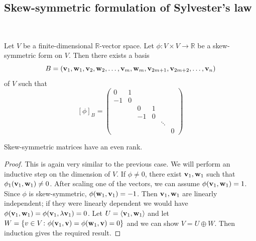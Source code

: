 \documentclass[a4paper,11pt]{article}
\begin{document}
\subsection{Skew-symmetric formulation of Sylvester's law}
\ \vspace*{-1.5em}
\begin{theorem}
	Let \( V \) be a finite-dimensional \( \mathbb R \)-vector space.
	Let \( \phi \colon V \times V \to \mathbb R \) be a skew-symmetric form on \( V \).
	Then there exists a basis
	\[
		B = ({\bf v}_1, {\bf w}_1, {\bf v}_2, {\bf w}_2, \dots, {\bf v}_m, {\bf w}_m, {\bf v}_{2m+1}, {\bf v}_{2m+2}, \dots, {\bf v}_n)
	\]
	of \( V \) such that
	\[
		[\phi]_B = \begin{pmatrix}
			0  & 1                       \\
			-1 & 0                       \\
			   &   & 0  & 1              \\
			   &   & -1 & 0              \\
			   &   &    &   & \ddots     \\
			   &   &    &   &        & 0
		\end{pmatrix}
	\]
\end{theorem}
\begin{corollary}
	Skew-symmetric matrices have an even rank.
\end{corollary}
\begin{proof}
	This is again very similar to the previous case.
	We will perform an inductive step on the dimension of \( V \).
	If \( \phi \neq 0 \), there exist \( {\bf v}_1, {\bf w}_1 \) such that \( \phi_1({\bf v}_1, {\bf w}_1) \neq 0 \).
	After scaling one of the vectors, we can assume \( \phi({\bf v}_1, {\bf w}_1) = 1 \).
	Since \( \phi \) is skew-symmetric, \( \phi({\bf w}_1, {\bf v}_1) = -1 \).
	Then \( {\bf v}_1, {\bf w}_1 \) are linearly independent; if they were linearly dependent we would have \( \phi({\bf v}_1, {\bf w}_1) = \phi({\bf v}_1, \lambda {\bf v}_1) = 0 \).
	Let \( U = \left\langle{} {\bf v}_1, {\bf w}_1 \right\rangle \) and let \( W = \qty{v \in V \colon \phi({\bf v}_1, {\bf v}) = \phi({\bf w}_1, {\bf v}) = 0} \) and we can show \( V = U \oplus W \).
	Then induction gives the required result.
\end{proof}
\end{document}
